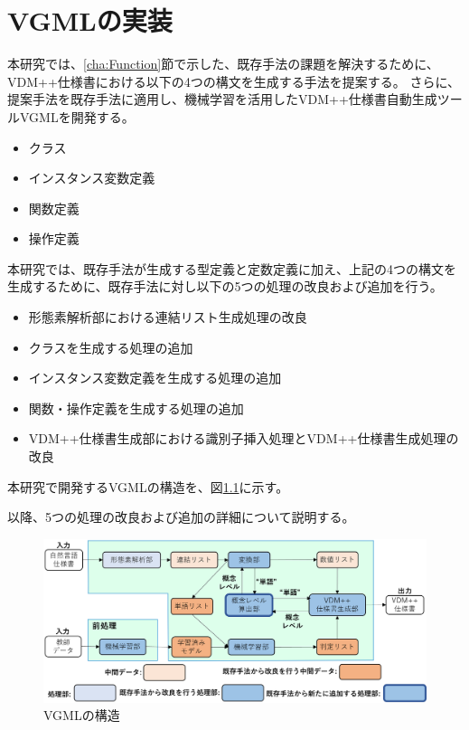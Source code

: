 \chapter{VGMLの実装}\label{cha:Implementation}

本研究では、\ref{cha:Function}節で示した、既存手法の課題を解決するために、VDM++仕様書における以下の4つの構文を生成する手法を提案する。
さらに、提案手法を既存手法に適用し、機械学習を活用したVDM++仕様書自動生成ツールVGMLを開発する。

\begin{itemize}
    \item クラス
    \item インスタンス変数定義
    \item 関数定義
    \item 操作定義
\end{itemize}

本研究では、既存手法が生成する型定義と定数定義に加え、上記の4つの構文を生成するために、既存手法に対し以下の5つの処理の改良および追加を行う。

\begin{itemize}
    \item 形態素解析部における連結リスト生成処理の改良
    \item クラスを生成する処理の追加
    \item インスタンス変数定義を生成する処理の追加
    \item 関数・操作定義を生成する処理の追加
    \item VDM++仕様書生成部における識別子挿入処理とVDM++仕様書生成処理の改良
\end{itemize}

本研究で開発するVGMLの構造を、図\ref{fig:vgml_structure}に示す。

以降、5つの処理の改良および追加の詳細について説明する。

\begin{figure}[t]
    \begin{center}
        \includegraphics[width=1.0\columnwidth]{image/vgml_structure.png}
        \caption{VGMLの構造}
        \label{fig:vgml_structure}
    \end{center}
\end{figure}

